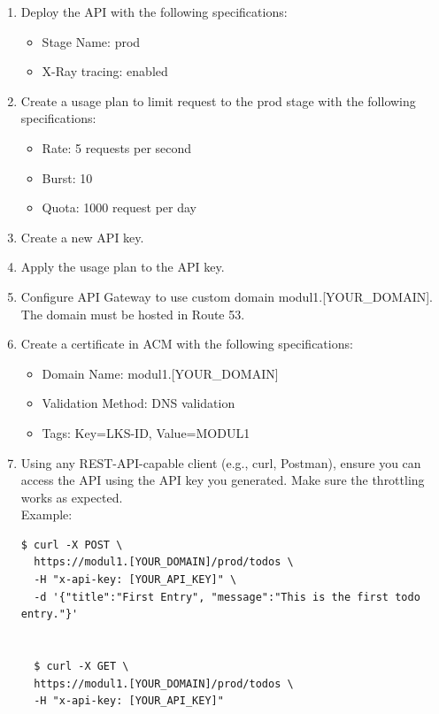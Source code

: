 \documentclass{article}
\begin{document}
\begin{enumerate}
  \item Deploy the API with the following specifications:
  \begin{itemize}
      \item Stage Name: prod
      \item X-Ray tracing: enabled
  \end{itemize}
  \item Create a usage plan to limit request to the prod stage with the following specifications:
  \begin{itemize}
      \item Rate: 5 requests per second
      \item Burst: 10
      \item Quota: 1000 request per day
  \end{itemize}
  \item Create a new API key.
  \item Apply the usage plan to the API key.
  \item Configure API Gateway to use custom domain modul1.[YOUR\_DOMAIN]. The domain must be hosted in Route 53.
  \item Create a certificate in ACM with the following specifications:
  \begin{itemize}
      \item Domain Name: modul1.[YOUR\_DOMAIN]
      \item Validation Method: DNS validation
      \item Tags: Key=LKS-ID, Value=MODUL1
  \end{itemize}
  \item Using any REST-API-capable client (e.g., curl, Postman), ensure you can access the API using the API key you generated. Make sure the throttling works as expected.\\
  Example: 
  \begin{lstlisting}[style=bashStyle]
  $ curl -X POST \
  https://modul1.[YOUR_DOMAIN]/prod/todos \
  -H "x-api-key: [YOUR_API_KEY]" \
  -d '{"title":"First Entry", "message":"This is the first todo entry."}'


  $ curl -X GET \
  https://modul1.[YOUR_DOMAIN]/prod/todos \
  -H "x-api-key: [YOUR_API_KEY]"
  \end{lstlisting}
\end{enumerate}
\end{document}
